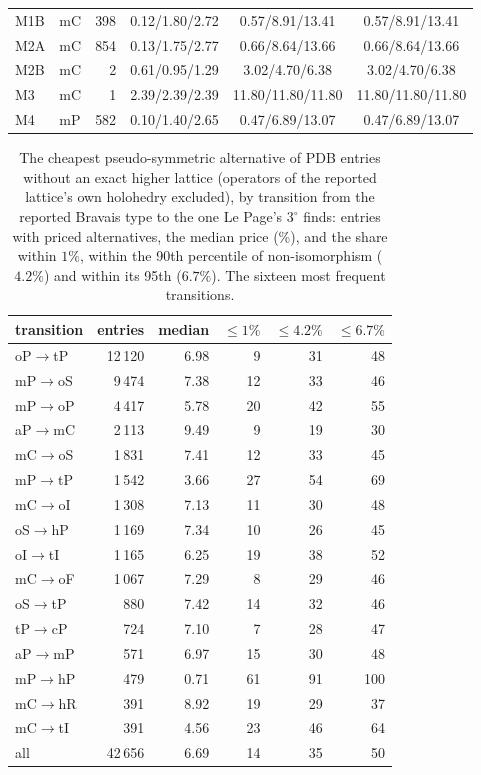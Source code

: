 \documentclass[preprint,pdf]{iucr}          %
\begin{document}
\begin{table}
\begin{footnotesize}
\begin{tabular}{llrccc}
M1B & mC & 398 & 0.12/1.80/2.72 & 0.57/8.91/13.41 & 0.57/8.91/13.41 \\
M2A & mC & 854 & 0.13/1.75/2.77 & 0.66/8.64/13.66 & 0.66/8.64/13.66 \\
M2B & mC & 2 & 0.61/0.95/1.29 & 3.02/4.70/6.38 & 3.02/4.70/6.38 \\
M3 & mC & 1 & 2.39/2.39/2.39 & 11.80/11.80/11.80 & 11.80/11.80/11.80 \\
M4 & mP & 582 & 0.10/1.40/2.65 & 0.47/6.89/13.07 & 0.47/6.89/13.07 \\
\bottomrule
\end{tabular}
\end{footnotesize}
\end{table}

\begin{table}
\caption{The cheapest pseudo-symmetric alternative of PDB entries without an exact higher lattice (operators of the reported lattice's own holohedry excluded), by transition from the reported Bravais type to the one Le Page's $3^\circ$ finds: entries with priced alternatives, the median price (\%), and the share within $1\%$, within the 90th percentile of non-isomorphism ($4.2\%$) and within its 95th ($6.7\%$). The sixteen most frequent transitions.}
\label{tab:pdbtrans}
\begin{footnotesize}
\begin{tabular}{lrrrrr}
\toprule
transition & entries & median & $\le1\%$ & $\le4.2\%$ & $\le6.7\%$ \\
\midrule
oP$\to$tP & 12\,120 & 6.98 & 9 & 31 & 48 \\
mP$\to$oS & 9\,474 & 7.38 & 12 & 33 & 46 \\
mP$\to$oP & 4\,417 & 5.78 & 20 & 42 & 55 \\
aP$\to$mC & 2\,113 & 9.49 & 9 & 19 & 30 \\
mC$\to$oS & 1\,831 & 7.41 & 12 & 33 & 45 \\
mP$\to$tP & 1\,542 & 3.66 & 27 & 54 & 69 \\
mC$\to$oI & 1\,308 & 7.13 & 11 & 30 & 48 \\
oS$\to$hP & 1\,169 & 7.34 & 10 & 26 & 45 \\
oI$\to$tI & 1\,165 & 6.25 & 19 & 38 & 52 \\
mC$\to$oF & 1\,067 & 7.29 & 8 & 29 & 46 \\
oS$\to$tP & 880 & 7.42 & 14 & 32 & 46 \\
tP$\to$cP & 724 & 7.10 & 7 & 28 & 47 \\
aP$\to$mP & 571 & 6.97 & 15 & 30 & 48 \\
mP$\to$hP & 479 & 0.71 & 61 & 91 & 100 \\
mC$\to$hR & 391 & 8.92 & 19 & 29 & 37 \\
mC$\to$tI & 391 & 4.56 & 23 & 46 & 64 \\
\midrule
all & 42\,656 & 6.69 & 14 & 35 & 50 \\
\bottomrule
\end{tabular}
\end{footnotesize}
\end{table}
\end{document}
